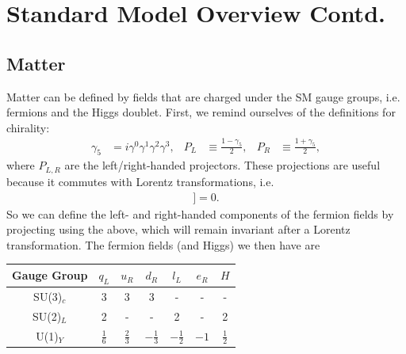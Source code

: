 \documentclass[a4paper, 11pt, normalem]{report}
\begin{document}
\chapter{Standard Model Overview Contd.}
\section{Matter}
Matter can be defined by fields that are charged under the SM gauge groups, i.e. fermions and the Higgs doublet.
First, we remind ourselves of the definitions for chirality:
\begin{align}
    \gamma_5 &= i\gamma^0\gamma^1\gamma^2\gamma^3, & P_L &\equiv\frac{1-\gamma_5}{2}, & P_R &\equiv \frac{1+\gamma_5}{2},
\end{align}
where $P_{L,R}$ are the left/right-handed projectors.
These projections are useful because it commutes with Lorentz transformations, i.e.
\begin{align}
    [\gamma_5,[\gamma_\mu,\gamma_\nu]] = 0.
\end{align}
So we can define the left- and right-handed components of the fermion fields by projecting using the above, which will remain invariant after a Lorentz transformation.
The fermion fields (and Higgs) we then have are
\begin{table}[H]
    \centering
    \begin{tabular}{c|c|c|c|c|c|c}
        \hline\hline
        Gauge Group & $q_L$ & $u_R$ & $d_R$ & $l_L$ & $e_R$ & $H$ \\
        \hline\hline
        SU(3)$_c$ & 3 & 3 & 3 & - & - & - \\
        SU(2)$_L$ & 2 & - & - & 2 & - & 2 \\
        U(1)$_Y$  & $\frac16$ & $\frac23$ & $-\frac13$ & $-\frac12$ & $-1$ & $\frac12$\\
        \hline\hline
    \end{tabular}
\end{table}
\end{document}
